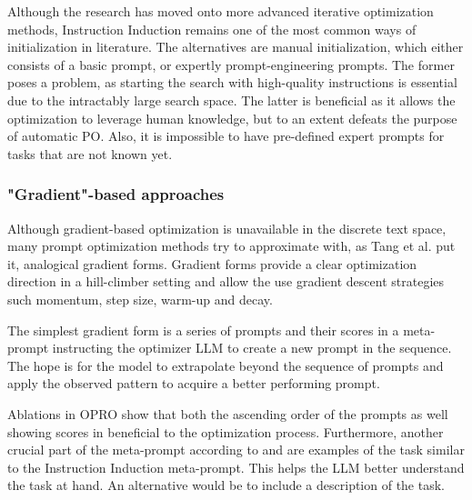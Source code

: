 Although the research has moved onto more advanced iterative optimization methods, Instruction Induction remains one of the 
most common ways of initialization in literature. The alternatives are manual initialization, which 
either consists of a basic prompt, or expertly prompt-engineering prompts. 
The former poses a problem, as starting the search with high-quality instructions 
is essential due to the intractably large search space\cite{opsahlong2024optimizinginstructionsdemonstrationsmultistage}. 
The latter is beneficial as it allows the optimization to leverage human knowledge\cite{guo2024connectinglargelanguagemodels}, but
to an extent defeats the purpose of automatic PO. Also, it is impossible to have pre-defined expert prompts for tasks that are not known yet.

\subsubsection{"Gradient"-based approaches}
Although gradient-based optimization is unavailable in the discrete text space, many prompt optimization methods try to approximate with,
as Tang et al.\cite{tang2024unleashingpotentiallargelanguage} put it, analogical gradient forms. Gradient forms provide a clear
optimization direction in a hill-climber setting and allow the use gradient descent strategies such momentum, step size, warm-up and decay.

The simplest gradient form is a series of prompts and their scores in a meta-prompt instructing the optimizer LLM
to create a new prompt in the sequence. The hope is for the model to extrapolate beyond the sequence of prompts
and apply the observed pattern to acquire a better performing prompt. 

Ablations in OPRO\cite{yang2024largelanguagemodelsoptimizers} show that both the ascending order of the prompts
as well showing scores in beneficial to the optimization process. Furthermore, another crucial part
of the meta-prompt according to \cite{yang2024largelanguagemodelsoptimizers} and \cite{tang2024unleashingpotentiallargelanguage} are examples of the task similar to the
Instruction Induction meta-prompt. This helps the LLM better understand the task at hand. An alternative would be to include a description of the task\cite{he2024crispomultiaspectcritiquesuggestionguidedautomatic}.

